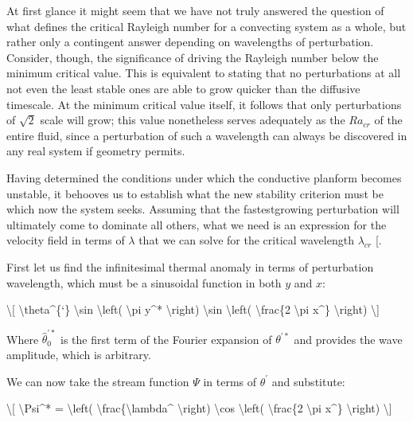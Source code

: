 \documentclass[letterpaper,10pt,english]{jupyterBook}
\begin{document}
\sphinxAtStartPar
At first glance it might seem that we have not truly answered the question of what defines the critical Rayleigh number for a convecting system as a whole, but rather only a contingent answer depending on wavelengths of perturbation. Consider, though, the significance of driving the Rayleigh number below the minimum critical value. This is equivalent to stating that no perturbations at all \sphinxhyphen{} not even the least stable ones \sphinxhyphen{} are able to grow quicker than the diffusive timescale. At the minimum critical value itself, it follows that only perturbations of \(\sqrt{2}\) scale will grow; this value nonetheless serves adequately as the \(Ra_{cr}\) of the entire fluid, since a perturbation of such a wavelength can always be discovered in any real system \sphinxhyphen{} if geometry permits.

\sphinxAtStartPar
Having determined the conditions under which the conductive planform becomes unstable, it behooves us to establish what the new stability criterion must be which now the system seeks. Assuming that the fastest\sphinxhyphen{}growing perturbation will ultimately come to dominate all others, what we need is an expression for the velocity field in terms of \(\lambda\) that we can solve for the critical wavelength \(\lambda_{cr}\) {[}\sphinxcite{references:id76}{]}.

\sphinxAtStartPar
First let us find the infinitesimal thermal anomaly in terms of perturbation wavelength, which must be a sinusoidal function in both \(y\) and \(x\):

\sphinxAtStartPar
\textbackslash{}{[} \textbackslash{}theta\textasciicircum{}\{‘\} \textbackslash{}sin \textbackslash{}left( \textbackslash{}pi y\textasciicircum{}* \textbackslash{}right) \textbackslash{}sin \textbackslash{}left( \textbackslash{}frac\{2 \textbackslash{}pi x\textasciicircum{}\} \textbackslash{}right) \textbackslash{}{]}

\sphinxAtStartPar
Where \(\widehat{\theta}_0^{'*}\) is the first term of the Fourier expansion of \(\theta^{'*}\) and provides the wave amplitude, which is arbitrary.

\sphinxAtStartPar
We can now take the stream function \(\Psi\) in terms of \(\theta^{'}\) and substitute:

\sphinxAtStartPar
\textbackslash{}{[} \textbackslash{}Psi\textasciicircum{}* = \sphinxhyphen{} \textbackslash{}left( \textbackslash{}frac\{\textbackslash{}lambda\textasciicircum{} \textbackslash{}right) \textbackslash{}cos \textbackslash{}left( \textbackslash{}frac\{2 \textbackslash{}pi x\textasciicircum{}\} \textbackslash{}right) \textbackslash{}{]}
\end{document}
